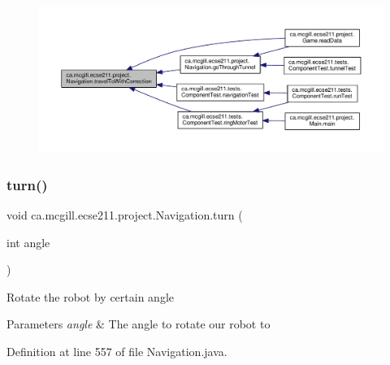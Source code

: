 \begin{figure}[H]
\begin{center}
\leavevmode
\includegraphics[width=350pt]{classca_1_1mcgill_1_1ecse211_1_1project_1_1_navigation_ae7230e905494002087416294f12cae6a_icgraph}
\end{center}
\end{figure}
\mbox{\label{classca_1_1mcgill_1_1ecse211_1_1project_1_1_navigation_ad74286ad36d333bfaf57661837457b76}} 
\subsubsection{\texorpdfstring{turn()}{turn()}}
{\footnotesize\ttfamily void ca.\+mcgill.\+ecse211.\+project.\+Navigation.\+turn (\begin{DoxyParamCaption}\item[{int}]{angle }\end{DoxyParamCaption})}

Rotate the robot by certain angle


\begin{DoxyParams}{Parameters}
{\em angle} & The angle to rotate our robot to \\
\hline
\end{DoxyParams}


Definition at line 557 of file Navigation.\+java.


